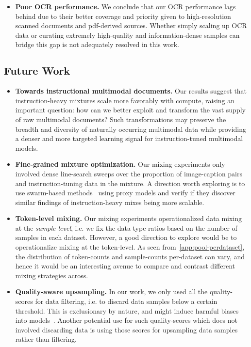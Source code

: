 \begin{itemize}
    \item \textbf{Poor OCR performance.} We conclude that our OCR performance lags behind \fv{} due to their better coverage and priority given to high-resolution scanned documents and pdf-derived sources. Whether simply scaling up OCR data or curating extremely high-quality and information-dense samples can bridge this gap is not adequately resolved in this work.
\end{itemize}

\subsection{Future Work}

\begin{itemize}
    \item \textbf{Towards instructional multimodal documents.} Our results suggest that instruction-heavy mixtures scale more favorably with compute, raising an important question: how can we better exploit and transform the vast supply of raw multimodal documents? 
    Such transformations may preserve the breadth and diversity of naturally occurring multimodal data while providing a denser and more targeted learning signal for instruction-tuned multimodal models.
    \item \textbf{Fine-grained mixture optimization.} Our mixing experiments only involved dense line-search sweeps over the proportion of image-caption pairs and instruction-tuning data in the mixture. A direction worth exploring is to use swarm-based methods~\citep{liu2024regmix,xie2023doremi,chen2026olmix} using proxy models and verify if they discover similar findings of instruction-heavy mixes being more scalable.
    \item \textbf{Token-level mixing.} Our mixing experiments operationalized data mixing at the \textit{sample level}, i.e. we fix the data type ratios based on the number of samples in each dataset. However, a good direction to explore would be to operationalize mixing at the token-level. As seen from~\cref{app:pool-perdataset}, the distribution of token-counts and sample-counts per-dataset can vary, and hence it would be an interesting avenue to compare and contrast different mixing strategies across.  
    \item \textbf{Quality-aware upsampling.} In our work, we only used all the quality-scores for data filtering, i.e. to discard data samples below a certain threshold. This is exclusionary by nature, and might induce harmful biases into models~\citep{hong2024s,dodge2021documenting}. Another potential use for such quality-scores which does not involved discarding data is using those scores for upsampling data samples rather than filtering. 
\end{itemize}
\clearpage
